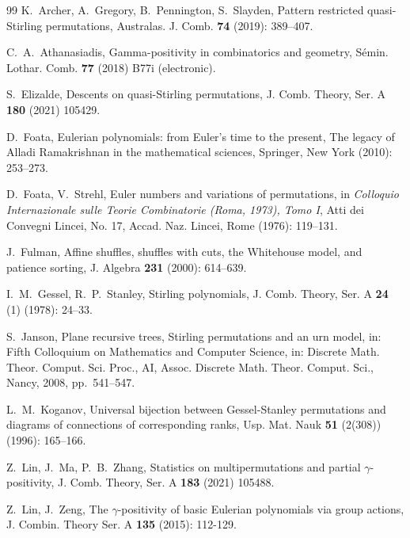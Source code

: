 \documentclass[11pt,reqno]{amsart}
\numberwithin{equation}{section}
\theoremstyle{plain}
\theoremstyle{definition}
\begin{document}
\begin{thebibliography}{99}
 K.~Archer, A.~Gregory, B.~Pennington, S.~Slayden, Pattern restricted quasi-Stirling permutations, Australas. J. Comb. {\bf 74} (2019): 389--407.

 C.~A.~Athanasiadis, Gamma-positivity in combinatorics and geometry, S\'emin. Lothar. Comb. {\bf 77} (2018) B77i (electronic).



 S.~Elizalde, Descents on quasi-Stirling permutations, J. Comb. Theory, Ser. A {\bf 180} (2021) 105429.

 D.~Foata, Eulerian polynomials: from Euler's time to the present, The legacy of Alladi Ramakrishnan in the mathematical sciences, Springer, New York (2010): 253--273.

 D.~Foata, V.~Strehl, Euler numbers and variations of permutations, in \textit{Colloquio Internazionale sulle Teorie Combinatorie (Roma, 1973), Tomo I}, Atti dei Convegni Lincei, No. 17, Accad. Naz. Lincei, Rome (1976): 119--131.

 J.~Fulman, Affine shuffles, shuffles with cuts, the Whitehouse model, and patience sorting, J. Algebra {\bf 231} (2000): 614--639.

 I.~M.~Gessel, R.~P.~Stanley, Stirling polynomials, J. Comb. Theory, Ser. A {\bf 24} (1) (1978): 24--33.

 S.~Janson, Plane recursive trees, Stirling permutations and an urn model, in: Fifth Colloquium on Mathematics and Computer Science, in: Discrete Math. Theor. Comput. Sci. Proc., AI, Assoc. Discrete Math. Theor. Comput. Sci., Nancy, 2008, pp.~541--547.

 L.~M.~Koganov, Universal bijection between Gessel-Stanley permutations and diagrams of connections of corresponding ranks, Usp. Mat. Nauk {\bf 51} (2(308)) (1996): 165--166.

 Z.~Lin, J.~Ma, P.~B.~Zhang, Statistics on multipermutations and partial $\gamma$-positivity, J. Comb. Theory, Ser. A {\bf 183} (2021) 105488.

 Z.~Lin, J.~Zeng, The $\gamma$-positivity of basic Eulerian polynomials via group actions, J. Combin. Theory Ser. A {\bf 135} (2015): 112-129.


\end{thebibliography}
\end{document}
